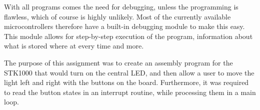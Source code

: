 With all programs comes the need for debugging, unless the programming is flawless, which of course is highly unlikely. Most of the currently available microcontrollers therefore have a built-in debugging module to make this easy. This module allows for step-by-step execution of the program, information about what is stored where at every time and more.

The purpose of this assignment was to create an assembly program for the STK1000 that would turn on the central LED, and then allow a user to move the light left and right with the buttons on the board. Furthermore, it was required to read the button states in an interrupt routine, while processing them in a main loop.
